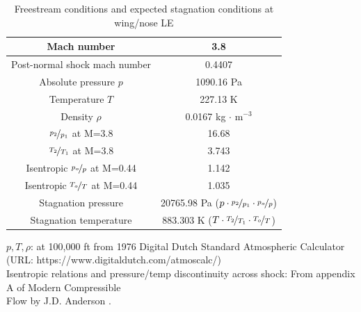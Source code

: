 \begin{table}[H]
\centering
	\caption{Freestream conditions and expected stagnation conditions at wing/nose LE}
	\begin{tabular}{|c|c|} \hline
	Mach number           & 3.8 \\ \hline
	Post-normal shock mach number & 0.4407 \\ \hline
	Absolute pressure $p$ 	& 1090.16 Pa \\ \hline
	Temperature $T$ 	& 227.13 K	\\ \hline
	Density $\rho$ 	& 0.0167 kg $\cdot$ m$^{-3}$ \\ \hline
	$\nicefrac{p_2}{p_1}$ at M=3.8 & 16.68 \\ \hline
	$\nicefrac{T_2}{T_1}$ at M=3.8 & 3.743 \\ \hline
	Isentropic $\nicefrac{p_o}{p}$ at M=0.44 & 1.142 \\ \hline
	Isentropic $\nicefrac{T_o}{T}$ at M=0.44 & 1.035 \\ \hline
	Stagnation pressure		& 20765.98 Pa ($p \cdot \nicefrac{p_2}{p_1} \cdot \nicefrac{p_o}{p}$) \\ \hline
	Stagnation temperature	& 883.303 K ($T \cdot \nicefrac{T_2}{T_1} \cdot \nicefrac{T_o}{T}$) \\ \hline
	\end{tabular}
\end{table}
\noindent$p, T, \rho$: at 100,000 ft from 1976 Digital Dutch Standard Atmospheric Calculator \\ \indent (URL: https://www.digitaldutch.com/atmoscalc/) \\
\noindent Isentropic relations and pressure/temp discontinuity across shock: From appendix A of Modern Compressible \\ \indent Flow by J.D. Anderson \cite{anderson_comp_flow}.
